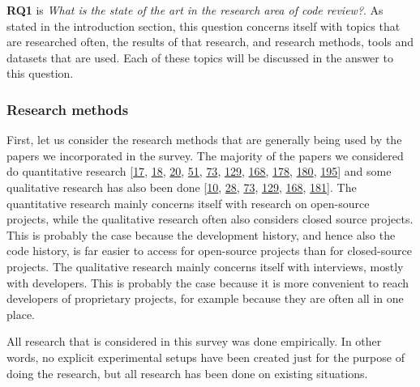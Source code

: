 \documentclass[]{book}
\begin{document}
\textbf{RQ1} is \emph{What is the state of the art in the research area
of code review?}. As stated in the introduction section, this question
concerns itself with topics that are researched often, the results of
that research, and research methods, tools and datasets that are used.
Each of these topics will be discussed in the answer to this question.

\subsubsection{Research methods}\label{research-methods}

First, let us consider the research methods that are generally being
used by the papers we incorporated in the survey. The majority of the
papers we considered do quantitative research
{[}\protect\hyperlink{ref-baysal2016investigating}{17},
\protect\hyperlink{ref-baysal2013influence}{18},
\protect\hyperlink{ref-beller2014modern}{20},
\protect\hyperlink{ref-czerwonka2015code}{51},
\protect\hyperlink{ref-gousios2014exploratory}{73},
\protect\hyperlink{ref-mcintosh2014impact}{129},
\protect\hyperlink{ref-shimagaki2016study}{168},
\protect\hyperlink{ref-thongtanunam2017review}{178},
\protect\hyperlink{ref-thongtanunam2015should}{180},
\protect\hyperlink{ref-zanjani2016automatically}{195}{]} and some
qualitative research has also been done
{[}\protect\hyperlink{ref-bacchelli2013expectations}{10},
\protect\hyperlink{ref-bird2015lessons}{28},
\protect\hyperlink{ref-gousios2014exploratory}{73},
\protect\hyperlink{ref-mcintosh2014impact}{129},
\protect\hyperlink{ref-shimagaki2016study}{168},
\protect\hyperlink{ref-thongtanunam2014reda}{181}{]}. The quantitative
research mainly concerns itself with research on open-source projects,
while the qualitative research often also considers closed source
projects. This is probably the case because the development history, and
hence also the code history, is far easier to access for open-source
projects than for closed-source projects. The qualitative research
mainly concerns itself with interviews, mostly with developers. This is
probably the case because it is more convenient to reach developers of
proprietary projects, for example because they are often all in one
place.

All research that is considered in this survey was done empirically. In
other words, no explicit experimental setups have been created just for
the purpose of doing the research, but all research has been done on
existing situations.
\end{document}
